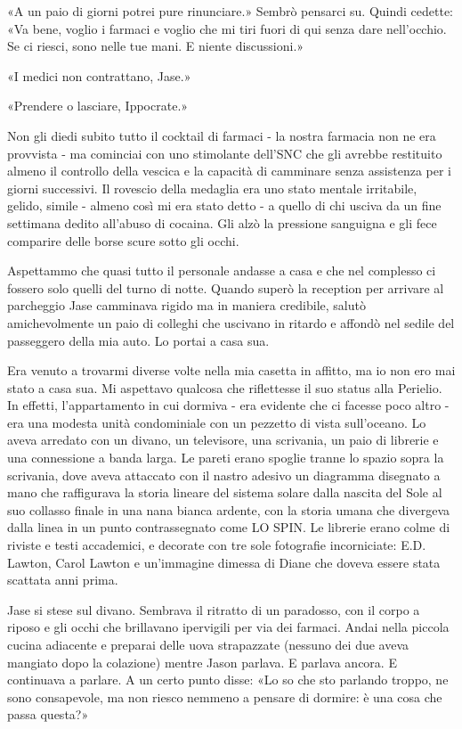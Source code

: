 «A un paio di giorni potrei pure rinunciare.» Sembrò pensarci su. Quindi
cedette: «Va bene, voglio i farmaci e voglio che mi tiri fuori di qui
senza dare nell'occhio. Se ci riesci, sono nelle tue mani. E niente
discussioni.»

«I medici non contrattano, Jase.»

«Prendere o lasciare, Ippocrate.»

\separatorefiori

Non gli diedi subito tutto il cocktail di farmaci - la nostra farmacia
non ne era provvista - ma cominciai con uno stimolante dell'SNC che gli
avrebbe restituito almeno il controllo della vescica e la capacità di
camminare senza assistenza per i giorni successivi. Il rovescio della
medaglia era uno stato mentale irritabile, gelido, simile - almeno così
mi era stato detto - a quello di chi usciva da un fine settimana dedito
all'abuso di cocaina. Gli alzò la pressione sanguigna e gli fece
comparire delle borse scure sotto gli occhi.

Aspettammo che quasi tutto il personale andasse a casa e che nel
complesso ci fossero solo quelli del turno di notte. Quando superò la
reception per arrivare al parcheggio Jase camminava rigido ma in maniera
credibile, salutò amichevolmente un paio di colleghi che uscivano in
ritardo e affondò nel sedile del passeggero della mia auto. Lo portai a
casa sua.

Era venuto a trovarmi diverse volte nella mia casetta in affitto, ma io
non ero mai stato a casa sua. Mi aspettavo qualcosa che riflettesse il
suo status alla Perielio. In effetti, l'appartamento in cui dormiva -
era evidente che ci facesse poco altro - era una modesta unità
condominiale con un pezzetto di vista sull'oceano. Lo aveva arredato con
un divano, un televisore, una scrivania, un paio di librerie e una
connessione a banda larga. Le pareti erano spoglie tranne lo spazio
sopra la scrivania, dove aveva attaccato con il nastro adesivo un
diagramma disegnato a mano che raffigurava la storia lineare del sistema
solare dalla nascita del Sole al suo collasso finale in una nana bianca
ardente, con la storia umana che divergeva dalla linea in un punto
contrassegnato come {LO} S{PIN}. Le librerie erano colme di riviste e
testi accademici, e decorate con tre sole fotografie incorniciate: E.D.
Lawton, Carol Lawton e un'immagine dimessa di Diane che doveva essere
stata scattata anni prima.

Jase si stese sul divano. Sembrava il ritratto di un paradosso, con il
corpo a riposo e gli occhi che brillavano ipervigili per via dei
farmaci. Andai nella piccola cucina adiacente e preparai delle uova
strapazzate (nessuno dei due aveva mangiato dopo la colazione) mentre
Jason parlava. E parlava ancora. E continuava a parlare. A un certo
punto disse: «Lo so che sto parlando troppo, ne sono consapevole, ma non
riesco nemmeno a pensare di dormire: è una cosa che passa questa?»

